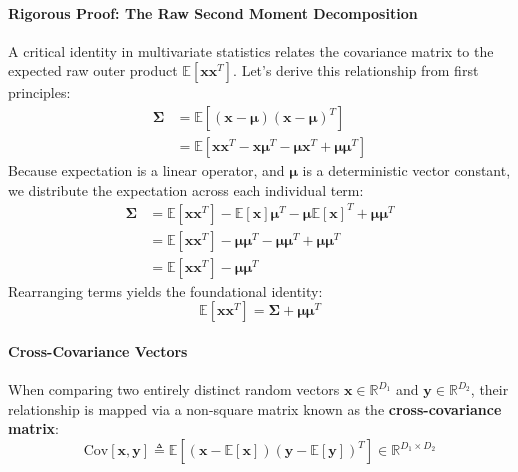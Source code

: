 \documentclass{article}
\begin{document}
\paragraph{Rigorous Proof: The Raw Second Moment Decomposition}
A critical identity in multivariate statistics relates the covariance matrix to the expected raw outer product $\mathbb{E}[\mathbf{x}\mathbf{x}^T]$. Let's derive this relationship from first principles:
\begin{align*}
\boldsymbol{\Sigma} &= \mathbb{E}\left[ (\mathbf{x} - \boldsymbol{\mu})(\mathbf{x} - \boldsymbol{\mu})^T \right] \\
&= \mathbb{E}\left[ \mathbf{x}\mathbf{x}^T - \mathbf{x}\boldsymbol{\mu}^T - \boldsymbol{\mu}\mathbf{x}^T + \boldsymbol{\mu}\boldsymbol{\mu}^T \right]
\end{align*}
Because expectation is a linear operator, and $\boldsymbol{\mu}$ is a deterministic vector constant, we distribute the expectation across each individual term:
\begin{align*}
\boldsymbol{\Sigma} &= \mathbb{E}[\mathbf{x}\mathbf{x}^T] - \mathbb{E}[\mathbf{x}]\boldsymbol{\mu}^T - \boldsymbol{\mu}\mathbb{E}[\mathbf{x}]^T + \boldsymbol{\mu}\boldsymbol{\mu}^T \\
&= \mathbb{E}[\mathbf{x}\mathbf{x}^T] - \boldsymbol{\mu}\boldsymbol{\mu}^T - \boldsymbol{\mu}\boldsymbol{\mu}^T + \boldsymbol{\mu}\boldsymbol{\mu}^T \\
&= \mathbb{E}[\mathbf{x}\mathbf{x}^T] - \boldsymbol{\mu}\boldsymbol{\mu}^T
\end{align*}
Rearranging terms yields the foundational identity:
\begin{equation}
\mathbb{E}[\mathbf{x}\mathbf{x}^T] = \boldsymbol{\Sigma} + \boldsymbol{\mu}\boldsymbol{\mu}^T \tag{4}
\end{equation}

\paragraph{Cross-Covariance Vectors}
When comparing two entirely distinct random vectors $\mathbf{x} \in \mathbb{R}^{D_1}$ and $\mathbf{y} \in \mathbb{R}^{D_2}$, their relationship is mapped via a non-square matrix known as the \textbf{cross-covariance matrix}:
\begin{equation}
\text{Cov}[\mathbf{x}, \mathbf{y}] \triangleq \mathbb{E}\left[ (\mathbf{x} - \mathbb{E}[\mathbf{x}])(\mathbf{y} - \mathbb{E}[\mathbf{y}])^T \right] \in \mathbb{R}^{D_1 \times D_2} \tag{5}
\end{equation}
\end{document}
